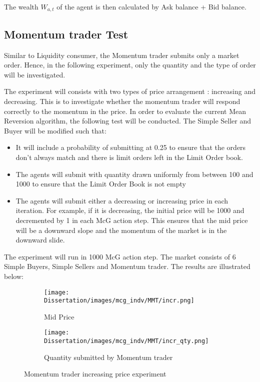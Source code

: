 The wealth $W_{a,t}$ of the agent is then calculated by Ask balance + Bid balance. 

\subsection{Momentum trader Test} 
Similar to Liquidity consumer, the Momentum trader submits only a market order. Hence, in the following experiment, only the quantity and the type of order will be investigated.  

The experiment will consists with two types of price arrangement : increasing and decreasing. This is to investigate whether the momentum trader will respond correctly to the momentum in the price. In order to evaluate the current Mean Reversion algorithm, the following test will be conducted. The Simple Seller and Buyer will be modified such that:
\begin{itemize}
  \item It will include a probability of submitting at 0.25 to ensure that the orders don't always match and there is limit orders left in the Limit Order book. 
  \item The agents will submit with quantity drawn uniformly from between 100 and 1000 to ensure that the Limit Order Book is not empty
  \item The agents will submit either a decreasing or increasing price in each iteration. For example, if it is decreasing, the initial price will be 1000 and decremented by 1 in each McG action step. This ensures that the mid price will be a downward slope and the momentum of the market is in the downward slide. 
\end{itemize}

The experiment will run in 1000 McG action step. The market consists of 6 Simple Buyers, Simple Sellers and Momentum trader. The results are illustrated below: 

\begin{figure}[h]
  \begin{subfigure}[b]{0.5\textwidth}
    \texttt{[image: Dissertation/images/mcg\_indv/MMT/incr.png]}
    \caption{Mid Price}
    \label{fig:1}
  \end{subfigure}
  \begin{subfigure}[b]{0.5\textwidth}
    \texttt{[image: Dissertation/images/mcg\_indv/MMT/incr\_qty.png]}
    \caption{Quantity submitted by Momentum trader}
    \label{fig:2}
  \end{subfigure}
\caption{Momentum trader increasing price experiment} 
\end{figure}


